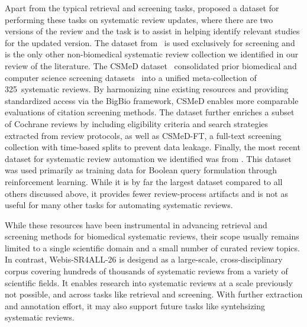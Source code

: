 Apart from the typical retrieval and screening tasks, \citet{alharbi:2019} proposed a dataset for performing these tasks on systematic review updates, where there are two versions of the review and the task is to assist in helping identify relevant studies for the updated version. The dataset from~\citet{hannousse:2021} is used exclusively for screening and is the only other non-biomedical systematic review collection we identified in our review of the literature. The CSMeD dataset~\cite{kusa:2023} consolidated prior biomedical and computer science screening datasets~\cite{cohen:2006,wallace:2010,howard:2016,scells:2017,kanoulas:2017,kanoulas:2018,kanoulas:2019,alharbi:2019,hannousse:2021} into a unified meta-collection of 325~systematic reviews. By harmonizing nine existing resources and providing standardized access via the BigBio framework, CSMeD enables more comparable evaluations of citation screening methods. The dataset further enriches a subset of Cochrane reviews by including eligibility criteria and search strategies extracted from review protocols, as well as CSMeD-FT, a full-text screening collection with time-based splits to prevent data leakage. Finally, the most recent dataset for systematic review automation we identified was from \citet{wang:2025b}. This dataset was used primarily as training data for Boolean query formulation through reinforcement learning. While it is by far the largest dataset compared to all others discussed above, it provides fewer review-process artifacts and is not as useful for many other tasks for automating systematic reviews.

While these resources have been instrumental in advancing retrieval and screening methods for biomedical systematic reviews, their scope usually remains limited to a single scientific domain and a small number of curated review topics. In contrast, Webis-SR4ALL-26 is desigend as a large-scale, cross-disciplinary corpus covering hundreds of thousands of systematic reviews from a variety of scientific fields. It enables research into systematic reviews at a scale previously not possible, and across tasks like retrieval and screening. With further extraction and annotation effort, it may also support future tasks like syntehsizing systematic reviews.
